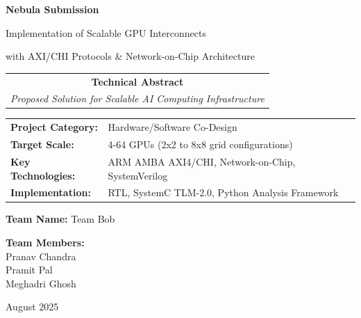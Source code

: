 \documentclass[11pt,a4paper]{article}
\begin{document}
\begin{titlepage}
    \centering
    \vspace*{2cm}
    
    {\Huge\textcolor{nebulablue}{\textbf{Nebula Submission}}}
    
    \vspace{0.5cm}
    {\Large\textcolor{nebulagray}{Implementation of Scalable GPU Interconnects}}
    
    \vspace{0.3cm}
    {\large\textcolor{nebulagray}{with AXI/CHI Protocols \& Network-on-Chip Architecture}}
    
    \vspace{2cm}
    
    \begin{tabular}{c}
        \textbf{\Large Technical Abstract} \\
        \textit{Proposed Solution for Scalable AI Computing Infrastructure}
    \end{tabular}
    
    \vspace{2cm}
    
    \begin{tabular}{ll}
        \textbf{Project Category:} & Hardware/Software Co-Design \\
        \textbf{Target Scale:} & 4-64 GPUs (2x2 to 8x8 grid configurations) \\
        \textbf{Key Technologies:} & ARM AMBA AXI4/CHI, Network-on-Chip, SystemVerilog \\
        \textbf{Implementation:} & RTL, SystemC TLM-2.0, Python Analysis Framework \\
    \end{tabular}
	\vspace{2cm}
	{\large \textbf{Team Name: } Team Bob} \\
	\vspace{1cm}

	{\large \textbf{Team Members: } \\\vspace{0.5cm} Pranav Chandra \\ Pramit Pal \\ Meghadri Ghosh}

	
    
    \vfill
    
    {\large August 2025}
\end{titlepage}

\newpage
\end{document}
